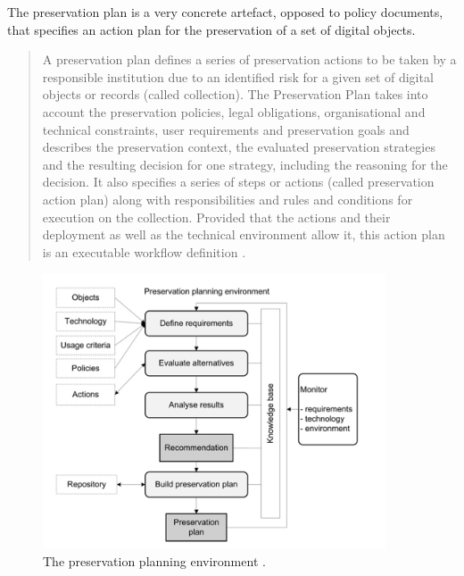The preservation plan is a very concrete artefact, opposed to policy documents, that specifies an action plan for the preservation of a set of digital objects.
\begin{quote}
A preservation plan defines a series of preservation actions to be taken by a responsible institution due to an identified risk for a given set of digital objects or records (called collection). The Preservation Plan takes into account the preservation policies, legal obligations, organisational and technical constraints, user requirements and preservation goals and describes the preservation context, the evaluated preservation strategies and the resulting decision for one strategy, including the reasoning for the decision. It also specifies a series of steps or actions (called preservation action plan) along with responsibilities and rules and conditions for execution on the collection. Provided that the actions and their deployment as well as the technical environment allow it, this action plan is an executable workflow definition \cite{Becker:2009fk}.
\end{quote}

\begin{figure}[th]
\begin{center}
\includegraphics[width=4.0in]{figures/related/planningenvironment.png}
\caption{The preservation planning environment \cite{becker:2010:trustowrothy}.}
\label{fig:planenv}
\end{center}
\end{figure}

